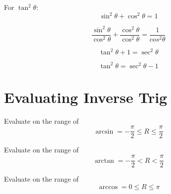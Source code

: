 \begin{minipage}{0.7\textwidth}
\begin{framed}
  For $\tan^2\theta:$
  \begin{equation*}
    \sin^2\theta + \cos^2\theta = 1
  \end{equation*}

  \begin{equation*}
    \frac{\sin^2\theta}{\cos^2\theta} + \frac{\cos^2\theta}{\cos^2\theta} = 
    \frac{1}{cos^2\theta}
  \end{equation*}

  \begin{equation*}
    \tan^2\theta + 1 = \sec^2\theta
  \end{equation*}

  \begin{equation*}
    \tan^2\theta = \sec^2\theta - 1
  \end{equation*}

\vspace{0.5cm}
\end{framed}
\end{minipage}


\section{Evaluating Inverse Trig}

\begin{framed}
  \noindent Evaluate on the range of
  \begin{equation*}
    \operatorname{arcsin} = -\frac{\pi}{2} \le R \le \frac{\pi}{2}
  \end{equation*}
\end{framed}

\begin{framed}
  \noindent Evaluate on the range of
  \begin{equation*}
    \operatorname{arctan} = -\frac{\pi}{2} < R < \frac{\pi}{2}
  \end{equation*}
\end{framed}

\begin{framed}
  \noindent Evaluate on the range of
  \begin{equation*}
    \operatorname{arccos} = 0 \le R \le \pi
  \end{equation*}
\end{framed}
